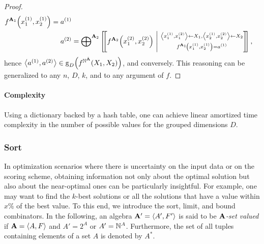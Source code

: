 \begin{proof}
\begin{align*}
{{                f^{\mathbf{A}_1}\!\left(x_1^{(1)}, x_2^{(1)}\right) = a^{(1)}
            }
        } \\
        a^{(2)} &= {\bigoplus}^{\mathbf{A}_2}\left[\mkern-4mu\left[
            f^{\mathbf{A}_2}\!\left(x_1^{(2)}, x_2^{(2)}\right)
            \ \middle|
            \ \substack{
                \left\langle x_1^{(1)}, x_1^{(2)}\right\rangle \gets X_1,
                \left\langle x_2^{(1)}, x_2^{(2)}\right\rangle \gets X_2\\[.5ex]
                f^{\mathbf{A}_1}\!\left(x_1^{(1)}, x_2^{(1)}\right) = a^{(1)}
            }
        \right]\mkern-5mu\right],
    \end{align*}
    hence \(\left\langle a^{(1)}, a^{(2)}\right\rangle \in \operatorname{g}_D\!\left(f^{\mathbb{N}^{\bar{\mathbf{A}}}}(X_1, X_2)\right)\), and conversely.
    This reasoning can be generalized to any \(n\), \(D\), \(k\), and to any argument of \(f\).
\end{proof}

\paragraph{Complexity}
Using a dictionary backed by a hash table, one can achieve linear amortized time complexity in the number of possible values for the grouped dimensions \(D\).

\subsubsection{Sort}\label{sec:adp:alg-combin:sort}

In optimization scenarios where there is uncertainty on the input data or on the scoring scheme, obtaining information not only about the optimal solution but also about the near-optimal ones can be particularly insightful.
For example, one may want to find the \(k\)-best solutions or all the solutions that have a value within \(x\%\) of the best value.
To this end, we introduce the sort, limit, and bound combinators.
In the following, an algebra \(\mathbf{A}' = \left\langle A', F'\right\rangle\) is said to be \emph{\(\mathbf{A}\)-set valued} if \(\mathbf{A} = \left\langle A, F\right\rangle\) and \(A' = 2^A\) or \(A' = \mathbb{N}^A\).
Furthermore, the set of all tuples containing elements of a set \(A\) is denoted by \(A^*\).

